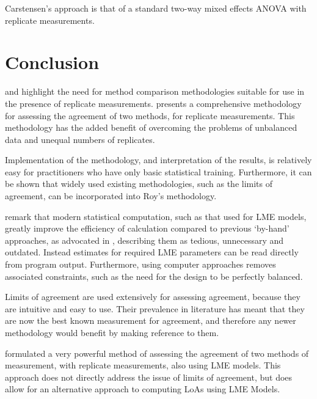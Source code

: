 \documentclass[12pt, a4paper]{report}
\theoremstyle{plain}
\theoremstyle{definition}
\theoremstyle{remark}
\begin{document}
	Carstensen's approach is that of a standard two-way mixed effects ANOVA with replicate measurements.
	

	

\section{Conclusion}
\citet{BXC2008} and \citet{ARoy2009} highlight the need for method comparison methodologies suitable for use in the presence of replicate measurements. \citet{ARoy2009} presents a comprehensive methodology for assessing the agreement of two methods, for replicate measurements. This methodology has the added benefit of overcoming the problems of unbalanced data and unequal numbers of replicates. 

Implementation of the methodology, and interpretation of the results, is relatively easy for practitioners who have only basic statistical training. Furthermore, it can be shown that widely used existing methodologies, such as the limits of agreement, can be incorporated into Roy's methodology.


	\citet{BXC2008} remark that modern statistical computation, such as that used for LME models, greatly improve the efficiency of calculation compared to previous `by-hand' approaches, as advocated in \citet{BA99}, describing them as tedious, unnecessary and outdated. Instead estimates for required LME parameters can be read directly from program output. Furthermore, using computer approaches removes associated constraints, such as the need for the design to be perfectly balanced.
	
	
	
	Limits of agreement are used extensively for assessing agreement, because they are intuitive and easy to use. Their prevalence in literature has meant that they are now the best known measurement for agreement, and therefore any newer methodology would benefit by making reference to them.
	
		
	\citet{ARoy2009} formulated a very powerful method of assessing the agreement of two methods of measurement, with replicate measurements, also using LME models. This approach does not directly address the issue of limits of agreement, but does allow for an alternative approach to computing LoAs using LME Models. 
	
\end{document}
